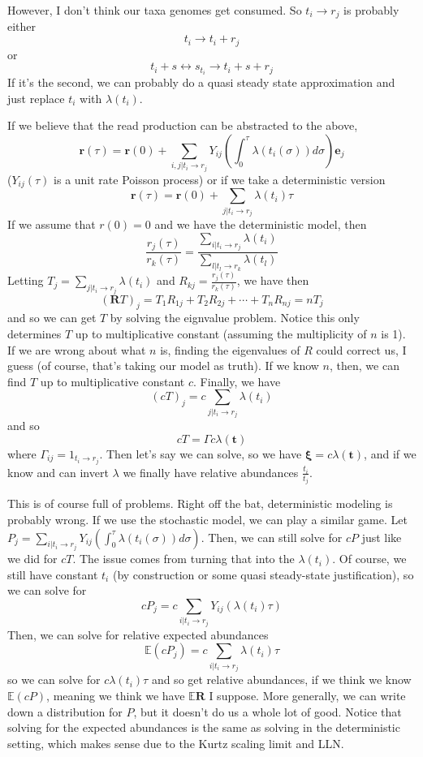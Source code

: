 \documentclass[10pt]{article}
\theoremstyle{definition}
\numberwithin{theorem}{section}
\numberwithin{definition}{section}
\numberwithin{lemma}{section}
\numberwithin{corollary}{section}
\numberwithin{clm}{section}
\numberwithin{rmk}{section}
\renewcommand{\b}{\bm}
\newcommand{\bE}{\mathbb{E}}
\begin{document}
However, I don't think our taxa genomes get consumed. So $t_i \rightarrow r_j$ is probably either
\[
t_i \rightarrow t_i + r_j
\]
or 
\[
t_i + s \leftrightarrow s_{t_i} \rightarrow t_i + s + r_j
\]
If it's the second, we can probably do a quasi steady state approximation and just replace $t_i$ with $\lambda(t_i)$. 

If we believe that the read production can be abstracted to the above,
\[
\b{r}(\tau) = \b{r}(0) + \sum_{i,j|t_i\rightarrow r_j} Y_{ij}\left(\int_0^{\tau} \lambda(t_i(\sigma))d\sigma\right)\b{e}_j
\]
($Y_{ij}(\tau)$ is a unit rate Poisson process) or if we take a deterministic version
\[
\b{r}(\tau) = \b{r}(0) + \sum_{j|t_i\rightarrow r_j} \lambda(t_i)\tau
\]
If we assume that $r(0) = 0$ and we have the deterministic model, then
\[
\frac{r_j(\tau)}{r_k(\tau)} = \frac{\sum_{i|t_i\rightarrow r_j} \lambda(t_i)}{\sum_{l|t_l\rightarrow r_k} \lambda(t_l)}
\]
Letting $T_j = \sum_{j|t_i\rightarrow r_j} \lambda(t_i)$ and $R_{kj} = \frac{r_j(\tau)}{r_k(\tau)}$, we have then
\[
(\b{R}T)_j  = T_{1}R_{1j} + T_2R_{2j} + \cdots + T_nR_{nj} = nT_j
\]
and so we can get $T$ by solving the eignvalue problem. Notice this only determines $T$ up to multiplicative constant (assuming the multiplicity of $n$ is 1). If we are wrong about what $n$ is, finding the eigenvalues of $R$ could correct us, I guess (of course, that's taking our model as truth). If we know $n$, then, we can find $T$ up to multiplicative constant $c$. Finally, we have
\[
(cT)_j = c\sum_{j|t_i\rightarrow r_j} \lambda(t_i)
\]
and so
\[
cT = \Gamma c\lambda(\b{t})
\]
where $\Gamma_{ij} = 1_{t_i \rightarrow r_j}$. Then let's say we can solve, so we have $\b{\xi} = c\lambda(\b{t})$, and if we know and can invert $\lambda$ we finally have relative abundances $\frac{t_i}{t_j}$. 

This is of course full of problems. Right off the bat, deterministic modeling is probably wrong. If we use the stochastic model, we can play a similar game. Let $P_j = \sum_{i|t_i\rightarrow r_j} Y_{ij}\left(\int_0^{\tau} \lambda(t_i(\sigma))d\sigma\right)$. Then, we can still solve for $cP$ just like we did for $cT$. The issue comes from turning that into the $\lambda(t_i)$. Of course, we still have constant $t_i$ (by construction or some quasi steady-state justification), so we can solve for
\[
cP_j = c\sum_{i|t_i\rightarrow r_j} Y_{ij}\left(\lambda(t_i)\tau\right)
\]
Then, we can solve for relative expected abundances
\[
\bE(cP_j)  = c\sum_{i|t_i \rightarrow r_j} \lambda(t_i)\tau
\]
so we can solve for $c\lambda(t_i)\tau$ and so get relative abundances, if we think we know $\bE(cP)$, meaning we think we have $\bE \b{R}$ I suppose. More generally, we can write down a distribution for $P$, but it doesn't do us a whole lot of good. Notice that solving for the expected abundances is the same as solving in the deterministic setting, which makes sense due to the Kurtz scaling limit and LLN. 
\end{document}
